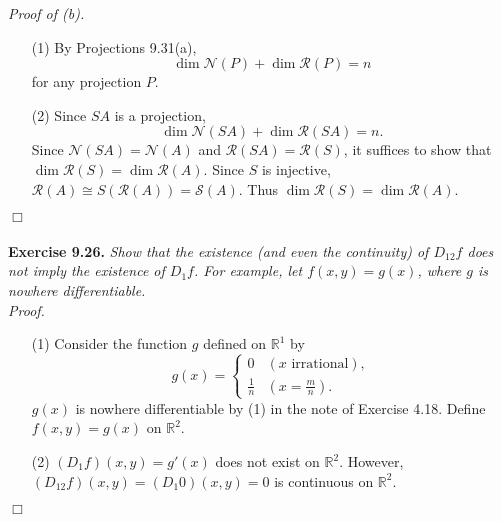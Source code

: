 \documentclass{article}
\begin{document}
\emph{Proof of (b).}
\begin{enumerate}
\item[(1)]
  By Projections 9.31(a),
  \[
    \dim \mathscr{N}(P) + \dim \mathscr{R}(P) = n
  \]
  for any projection $P$.

\item[(2)]
  Since $SA$ is a projection,
  \[
    \dim \mathscr{N}(SA) + \dim \mathscr{R}(SA) = n.
  \]
  Since $\mathscr{N}(SA) = \mathscr{N}(A)$ and $\mathscr{R}(SA) = \mathscr{R}(S)$,
  it suffices to show that $\dim \mathscr{R}(S) = \dim \mathscr{R}(A)$.
  Since $S$ is injective, $\mathscr{R}(A) \cong S(\mathscr{R}(A)) = \mathscr{S}(A)$.
  Thus $\dim \mathscr{R}(S) = \dim \mathscr{R}(A)$.
\end{enumerate}
$\Box$ \\\\






\textbf{Exercise 9.26.}
\emph{Show that the existence (and even the continuity) of $D_{12}f$
does not imply the existence of $D_1 f$.
For example, let $f(x,y) = g(x)$, where $g$ is nowhere differentiable.} \\

\emph{Proof.}
\begin{enumerate}
\item[(1)]
  Consider the function $g$ defined on $\mathbb{R}^1$ by
  \begin{equation*}
    g(x) =
      \begin{cases}
        0           & (\text{$x$ irrational}), \\
        \frac{1}{n} & (x = \frac{m}{n}).
      \end{cases}
  \end{equation*}
  $g(x)$ is nowhere differentiable by (1) in the note of Exercise 4.18.
  Define $f(x,y) = g(x)$ on $\mathbb{R}^2$. \\

\item[(2)]
  $(D_1 f)(x,y) = g'(x)$ does not exist on $\mathbb{R}^2$.
  However, $(D_{12} f)(x,y) = (D_1 0)(x,y) = 0$ is continuous on $\mathbb{R}^2$.
\end{enumerate}
$\Box$ \\
\end{document}
